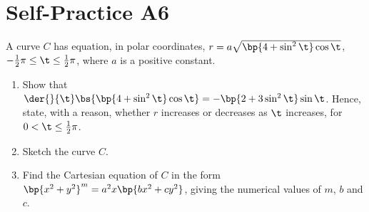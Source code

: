 \section{Self-Practice A6}

\begin{problem}
    A curve $C$ has equation, in polar coordinates, $r = a\sqrt{\bp{4 + \sin^2 \t} \cos \t}$, $-\frac12 \pi \leq \t \leq \frac12 \pi$, where $a$ is a positive constant.

    \begin{enumerate}
        \item Show that $\der{}{\t} \bs{\bp{4 + \sin^2 \t}\cos\t} = -\bp{2 + 3\sin^2 \t} \sin \t$. Hence, state, with a reason, whether $r$ increases or decreases as $\t$ increases, for $0 < \t \leq \frac12 \pi$.
        \item Sketch the curve $C$.
        \item Find the Cartesian equation of $C$ in the form $\bp{x^2 + y^2}^m = a^2 x \bp{bx^2 + cy^2}$, giving the numerical values of $m$, $b$ and $c$.
    \end{enumerate}
\end{problem}
